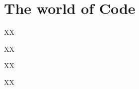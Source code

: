 \chapter{The world of Code}
\label{chap:worldcode}

\begin{abstract}{Abstract}
  
Programming is no longer a solitary activity, and almost all questions, problems, and error messages have been encountered and solved before. This chapter explains the most common forms of collaboration and sources of outside help, as well as giving best practices on how to write and share code yourself.
\end{abstract}


\begin{objectives}
\item XX
\item XX
\item XX
\end{objectives}

\begin{feature}
XX
\end{feature}




